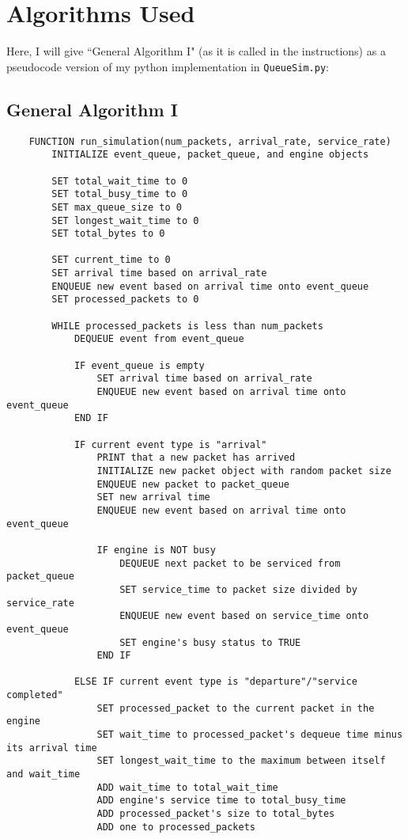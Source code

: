 \documentclass{article}
\begin{document}
\section{Algorithms Used}

Here, I will give ``General Algorithm I" (as it is called in the instructions) as a pseudocode version of my python implementation in \verb|QueueSim.py|:

\subsection{General Algorithm I}

\begin{verbatim}
    FUNCTION run_simulation(num_packets, arrival_rate, service_rate)
        INITIALIZE event_queue, packet_queue, and engine objects
        
        SET total_wait_time to 0
        SET total_busy_time to 0
        SET max_queue_size to 0
        SET longest_wait_time to 0
        SET total_bytes to 0
        
        SET current_time to 0
        SET arrival time based on arrival_rate
        ENQUEUE new event based on arrival time onto event_queue
        SET processed_packets to 0

        WHILE processed_packets is less than num_packets
            DEQUEUE event from event_queue
            
            IF event_queue is empty
                SET arrival time based on arrival_rate
                ENQUEUE new event based on arrival time onto event_queue
            END IF

            IF current event type is "arrival"
                PRINT that a new packet has arrived
                INITIALIZE new packet object with random packet size
                ENQUEUE new packet to packet_queue
                SET new arrival time
                ENQUEUE new event based on arrival time onto event_queue

                IF engine is NOT busy
                    DEQUEUE next packet to be serviced from packet_queue
                    SET service_time to packet size divided by service_rate
                    ENQUEUE new event based on service_time onto event_queue
                    SET engine's busy status to TRUE
                END IF

            ELSE IF current event type is "departure"/"service completed"
                SET processed_packet to the current packet in the engine
                SET wait_time to processed_packet's dequeue time minus its arrival time
                SET longest_wait_time to the maximum between itself and wait_time
                ADD wait_time to total_wait_time
                ADD engine's service time to total_busy_time
                ADD processed_packet's size to total_bytes
                ADD one to processed_packets


\end{verbatim}
\end{document}
